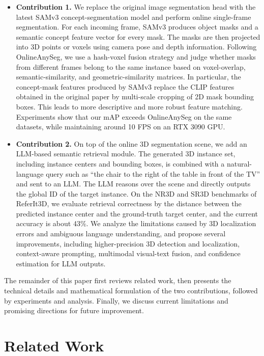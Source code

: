 \documentclass[12pt,a4paper]{article}
\begin{document}
\begin{itemize}[leftmargin=2em]
  \item \textbf{Contribution 1.} We replace the original image segmentation head with the latest SAMv3 concept-segmentation model and perform online single-frame segmentation. For each incoming frame, SAMv3 produces object masks and a semantic concept feature vector for every mask. The masks are then projected into 3D points or voxels using camera pose and depth information. Following OnlineAnySeg, we use a hash-voxel fusion strategy and judge whether masks from different frames belong to the same instance based on voxel-overlap, semantic-similarity, and geometric-similarity matrices. In particular, the concept-mask features produced by SAMv3 replace the CLIP features obtained in the original paper by multi-scale cropping of 2D mask bounding boxes. This leads to more descriptive and more robust feature matching. Experiments show that our mAP exceeds OnlineAnySeg on the same datasets, while maintaining around 10 FPS on an RTX 3090 GPU.
  \item \textbf{Contribution 2.} On top of the online 3D segmentation scene, we add an LLM-based semantic retrieval module. The generated 3D instance set, including instance centers and bounding boxes, is combined with a natural-language query such as ``the chair to the right of the table in front of the TV'' and sent to an LLM. The LLM reasons over the scene and directly outputs the global ID of the target instance. On the NR3D and SR3D benchmarks of ReferIt3D, we evaluate retrieval correctness by the distance between the predicted instance center and the ground-truth target center, and the current accuracy is about 43\%. We analyze the limitations caused by 3D localization errors and ambiguous language understanding, and propose several improvements, including higher-precision 3D detection and localization, context-aware prompting, multimodal visual-text fusion, and confidence estimation for LLM outputs.
\end{itemize}

The remainder of this paper first reviews related work, then presents the technical details and mathematical formulation of the two contributions, followed by experiments and analysis. Finally, we discuss current limitations and promising directions for future improvement.

\section{Related Work}
\end{document}
